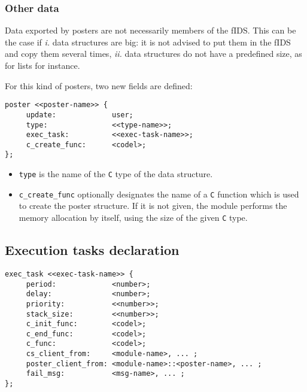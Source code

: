 \subsubsection{Other data}

Data exported by posters  are not necessarily members  of the fIDS.  This
can be the case if {\em i.} data structures are big: it is not advised to
put  them in   the fIDS and   copy them  several times, {\em   ii.}  data
structures do not have a predefined size, as for lists for instance.

For this kind of posters, two new fields are defined:

\begin{center}\begin{cartouche}\small\begin{verbatim}
poster <<poster-name>> {
     update:             user;
     type:               <<type-name>>;
     exec_task:          <<exec-task-name>>; 
     c_create_func:      <codel>;
};
\end{verbatim}\end{cartouche}\end{center}

\begin{itemize}
\item {\tt type} is the name of the {\tt C} type of the data structure.
\item {\tt c\_create\_func} optionally designates the name of a {\tt C}
function which is   used to create the  poster  structure. If  it is  not
given,  the  module performs the memory  allocation  by itself, using the
size of the  given {\tt C} type.
\end{itemize}


\subsection{Execution tasks declaration}

\begin{center}\begin{cartouche}\small\begin{verbatim}
exec_task <<exec-task-name>> {
     period:             <number>;
     delay:              <number>;
     priority:           <<number>>;
     stack_size:         <<number>>;
     c_init_func:        <codel>;
     c_end_func:         <codel>;
     c_func:             <codel>;
     cs_client_from:     <module-name>, ... ;
     poster_client_from: <module-name>::<poster-name>, ... ;
     fail_msg:           <msg-name>, ... ;
};
\end{verbatim}\end{cartouche}\end{center}


